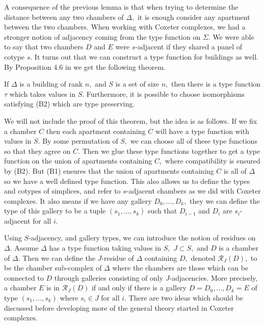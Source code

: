 \documentclass[class=book, crop=false,12 pt]{standalone}
\begin{document}
A consequence of the previous lemma is that when trying to determine the distance between any two chambers of $\Delta,$ it is enough consider any apartment between the two chambers. When working with Coxeter complexes, we had a stronger notion of adjacency coming from the type function on $\Sigma.$ We were able to say that two chambers $D$ and $E$ were $s$-adjacent if they shared a panel of cotype $s.$ It turns out that we can construct a type function for buildings as well. By Proposition 4.6 in \cite{buildings} we get the following theorem.
\begin{theorem}
	\label{thm:type}
	If $\Delta$ is a building of rank $n,$ and $S$ is a set of size $n,$ then there is a type function $\tau$ which takes values in $S.$ Furthermore, it is possible to choose isomorphisms satisfying (B2) which are type preserving.
\end{theorem}

We will not include the proof of this theorem, but the idea is as follows. If we fix a chamber $C$ then each apartment containing $C$ will have a type function with values in $S.$ By some permutation of $S,$ we can choose all of these type functions so that they agree on $C.$ Then we glue these type functions together to get a type function on the union of apartments containing $C,$ where compatibility is ensured by (B2). But (B1) ensures that the union of apartments containing $C$ is all of $\Delta$ so we have a well defined type function. This also allows us to define the types and cotypes of simplices, and refer to $s$-adjacent chambers as we did with Coxeter complexes. It also means if we have any gallery $D_0,\dots,D_k,$ they we can define the type of this gallery to be a tuple $(s_1,\dots,s_k)$ such that $D_{i-1}$ and $D_i$ are $s_i$-adjacent for all $i.$

Using $S$-adjacency, and gallery types, we can introduce the notion of residues on $\Delta.$ Assume $\Delta$ has a type function taking values in $S,$ $J\subset S,$ and $D$ is a chamber of $\Delta.$ Then we can define the $J$-residue of $\Delta$ containing $D,$ denoted $\mathcal{R}_J(D),$ to be the chamber sub-complex of $\Delta$ where the chambers are those which can be connected to $D$ through galleries consisting of only $J$-adjacencies. More precisely, a chamber $E$ is in $\mathcal{R}_J(D)$ if and only if there is a gallery $D=D_0,\dots,D_k=E$ of type $(s_1,\dots,s_k)$ where $s_i\in J$ for all $i.$ There are two ideas which should be discussed before developing more of the general theory started in Coxeter complexes.
\end{document}
